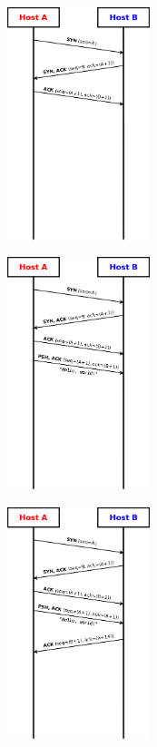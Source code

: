 \documentclass{beamer}
\begin{document}
\begin{frame}[allowframebreaks]{\insertsection}{\insertsubsection}
\begin{figure}
\end{figure}
\framebreak
\begin{figure}
\includegraphics[width=0.37\textwidth]{imgs/tcp-3-way-handshake-03.drawio.png}
\end{figure}
\framebreak
\begin{figure}
\includegraphics[width=0.37\textwidth]{imgs/tcp-3-way-handshake-04.drawio.png}
\end{figure}
\framebreak
\begin{figure}
\includegraphics[width=0.37\textwidth]{imgs/tcp-3-way-handshake-05.drawio.png}

\end{figure}
\end{frame}
\end{document}
